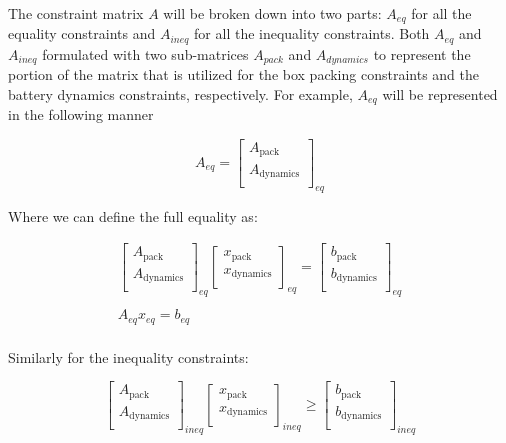 \documentclass[letterpaper, 10pt, conference]{IEEEtran}
\begin{document}
The constraint matrix \(A\) will be broken down into two parts:
\(A_{eq}\) for all the equality constraints and \(A_{ineq}\) for all the
inequality constraints. Both \(A_{eq}\) and \(A_{ineq}\) formulated with
two sub-matrices \(A_{pack}\) and \(A_{dynamics}\) to represent the
portion of the matrix that is utilized for the box packing constraints
and the battery dynamics constraints, respectively. For example,
\(A_{eq}\) will be represented in the following manner

\[
A_{eq} =
\begin{bmatrix}
    A_{\textrm{pack}}     \\
    A_{\textrm{dynamics}} \\
\end{bmatrix}_{eq}
\]

Where we can define the full equality as:

\[
\begin{array}{c}
    \begin{bmatrix}
        A_{\textrm{pack}}     \\
        A_{\textrm{dynamics}} \\
    \end{bmatrix}_{eq}
    \begin{bmatrix}
        x_{\textrm{pack}}     \\
        x_{\textrm{dynamics}} \\
    \end{bmatrix}_{eq} =
    \begin{bmatrix}
        b_{\textrm{pack}}     \\
        b_{\textrm{dynamics}} \\
    \end{bmatrix}_{eq} \\
    \\
    A_{eq} x_{eq} = b_{eq} \\
\end{array}
\]

Similarly for the inequality constraints:

\[
\begin{bmatrix}
    A_{\textrm{pack}}     \\
    A_{\textrm{dynamics}} \\
\end{bmatrix}_{ineq}
\begin{bmatrix}
    x_{\textrm{pack}}     \\
    x_{\textrm{dynamics}} \\
\end{bmatrix}_{ineq} \geq
\begin{bmatrix}
    b_{\textrm{pack}}     \\
    b_{\textrm{dynamics}} \\
\end{bmatrix}_{ineq}
\]
\end{document}
